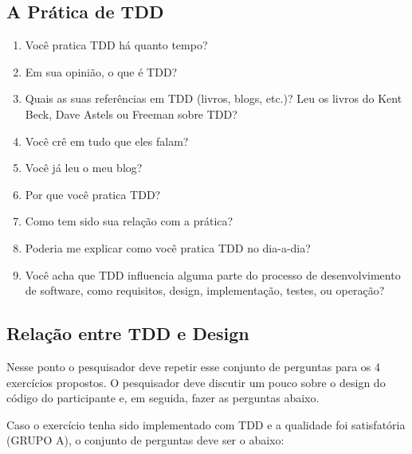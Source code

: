 \subsection{A Prática de TDD}

\begin{enumerate}
	\item Você pratica TDD há quanto tempo?

	\item Em sua opinião, o que é TDD?
	
	\item Quais as suas referências em TDD (livros, blogs, etc.)? 
		  Leu os livros do Kent Beck, Dave Astels ou Freeman sobre TDD?

	\item Você crê em tudo que eles falam?
	
	\item Você já leu o meu blog?
	
	\item Por que você pratica TDD?

	\item Como tem sido sua relação com a prática?

	\item Poderia me explicar como você pratica TDD no dia-a-dia?

	\item Você acha que TDD influencia alguma parte do processo de desenvolvimento
	de software, como requisitos, design, implementação, testes, ou operação?
\end{enumerate}

\subsection{Relação entre TDD e Design}

Nesse ponto o pesquisador deve repetir esse conjunto de perguntas
para os 4 exercícios propostos.
O pesquisador deve discutir um pouco sobre o design do código do participante e, em seguida,
fazer as perguntas abaixo.

Caso o exercício tenha sido implementado com TDD e a qualidade foi satisfatória (GRUPO A),
o conjunto de perguntas deve ser o abaixo:

